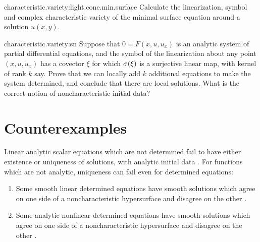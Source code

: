 \begin{problem}{characteristic.variety:light.cone.min.surface}
Calculate the linearization, symbol and complex characteristic variety of the minimal surface equation around a solution \(u(x,y)\).
\end{problem}
\begin{problem}{characteristic.variety:sn}
Suppose that \(0=F(x,u,u_x)\) is an analytic system of partial differential equations, and the symbol of the linearization about any point \((x,u,u_x)\) has a covector \(\xi\) for which \(\opsymbol[]{\xi}\) is a surjective linear map, with kernel of rank \(k\) say.
Prove that we can locally add \(k\) additional equations to make the system determined, and conclude that there are local solutions.
What is the correct notion of noncharacteristic initial data?
\end{problem}
\section{Counterexamples}
Linear analytic scalar equations which are not determined fail to have either existence or uniqueness of solutions, with analytic initial data \cite{Kitagawa:1990}. 
For functions which are not analytic,  uniqueness can fail even for determined equations:
\begin{enumerate}
\item
Some smooth linear determined equations have smooth solutions which agree on one side of a noncharacteristic hypersurface and disagree on the other \cite{Alinhac/Baouendi:1995}.
\item
Some analytic nonlinear determined equations have smooth solutions which agree on one side of a noncharacteristic hypersurface and disagree on the other \cite{Metivier:1993}.
\end{enumerate}

